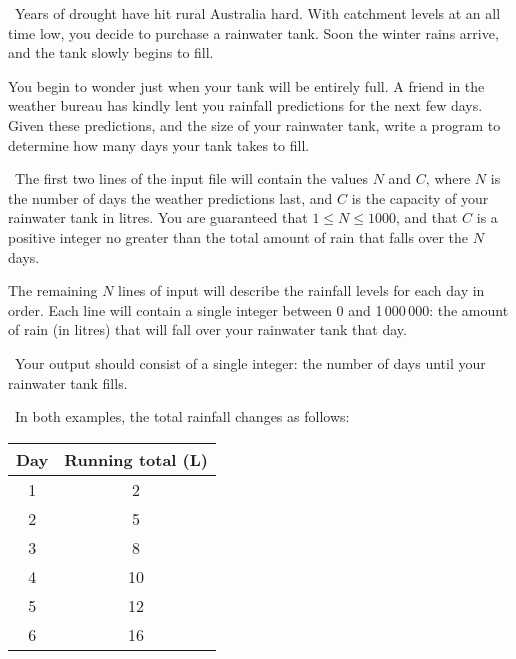 

\Question\ \quad Years of drought have hit rural Australia hard.
With catchment levels at an all time low, you decide to purchase a rainwater tank. Soon
the winter rains arrive, and the tank slowly begins to fill.

You begin to wonder just when your tank will be entirely full. A friend
in the weather bureau has kindly lent you rainfall predictions for the next few days.
Given these predictions, and the size of your rainwater tank, write a program to determine
how many days your tank takes to fill.

\Input\ The first two lines of the input file will contain the values $N$ and $C$, where
$N$ is the number of days the weather predictions last, and $C$ is the capacity of your
rainwater tank in litres.  You are guaranteed that $1 \le N \le 1000$, and that $C$ is a
positive integer no greater than the total amount of rain that falls over the $N$ days.

The remaining $N$ lines of input will describe the rainfall levels for each day in order.
Each line will contain a single integer between 0 and 1\,000\,000: the amount of rain (in
litres) that will fall over your rainwater tank that day.

\Output\ Your output should consist of a single integer: the number of days until your
rainwater tank fills.

\Sample



\Explanation\ In both examples, the total rainfall changes as follows:

\begin{inlinetable*}
  \begin{tabular}{c S[table-format=2.0]}
    \toprule
    {Day} & {Running total (L)} \\
       & 2                 \\
    2   & 5                 \\
    3   & 8                 \\
    4   & 10                \\
    5   & 12                \\
    6   & 16                \\
    \bottomrule
  \end{tabular}
\end{inlinetable*}

